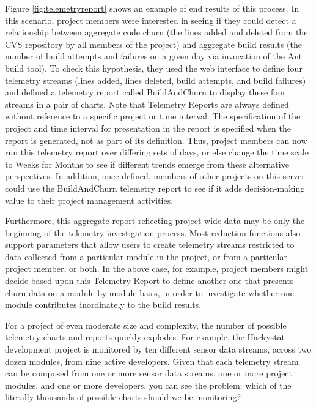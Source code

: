 \documentclass[11pt,twocolumn]{article}
\begin{document}
Figure \ref{fig:telemetryreport} shows an example of end results of this
process.  In this scenario, project members were interested in seeing if
they could detect a relationship between aggregate code churn (the lines
added and deleted from the CVS repository by all members of the project)
and aggregate build results (the number of build attempts and failures on a
given day via invocation of the Ant build tool).  To check this hypothesis,
they used the web interface to define four telemetry streams (lines added,
lines deleted, build attempts, and build failures) and defined a telemetry
report called BuildAndChurn to display these four streams in a pair of
charts.  Note that Telemetry Reports are always defined without reference
to a specific project or time interval.  The specification of the project
and time interval for presentation in the report is specified when the
report is generated, not as part of its definition.  Thus, project members
can now run this telemetry report over differing sets of days, or else
change the time scale to Weeks for Months to see if different trends emerge
from these alternative perspectives.  In addition, once defined, members of
other projects on this server could use the BuildAndChurn telemetry report
to see if it adds decision-making value to their project management
activities.

Furthermore, this aggregate report reflecting project-wide data may be only
the beginning of the telemetry investigation process.  Most reduction
functions also support parameters that allow users to create telemetry
streams restricted to data collected from a particular module in the
project, or from a particular project member, or both.  In the above case,
for example, project members might decide based upon this Telemetry Report
to define another one that presents churn data on a module-by-module basis,
in order to investigate whether one module contributes inordinately to the
build results.


For a project of even moderate size and complexity, the number of possible
telemetry charts and reports quickly explodes.  For example, the
Hackystat development project is monitored by ten different sensor data
streams, across two dozen modules, from nine active developers.  Given that
each telemetry stream can be composed from one or more sensor data streams,
one or more project modules, and one or more developers, you can see the
problem: which of the literally thousands of possible charts should we be
monitoring? 
\end{document}
